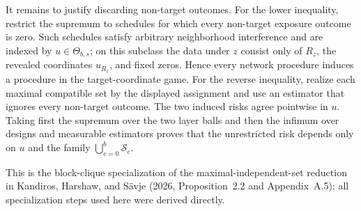 It remains to justify discarding non-target outcomes. For the lower inequality, restrict the supremum to schedules for which every non-target exposure outcome is zero. Such schedules satisfy arbitrary neighborhood interference and are indexed by \(u\in\Theta_{b,s}\); on this subclass the data under \(z\) consist only of \(R_z\), the revealed coordinates \(u_{R_z}\), and fixed zeros. Hence every network procedure induces a procedure in the target-coordinate game. For the reverse inequality, realize each maximal compatible set by the displayed assignment and use an estimator that ignores every non-target outcome. The two induced risks agree pointwise in \(u\). Taking first the supremum over the two layer balls and then the infimum over designs and measurable estimators proves that the unrestricted risk depends only on \(u\) and the family \(\bigcup_{c=0}^b\mathcal S_c\).

This is the block-clique specialization of the maximal-independent-set reduction in Kandiros, Harshaw, and S\"avje (2026, Proposition~2.2 and Appendix~A.5); all specialization steps used here were derived directly.
